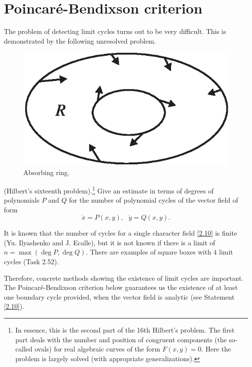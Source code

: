 \section{Poincaré-Bendixson criterion}

The problem of detecting limit cycles turns out to be very difficult. This is demonstrated by the following unresolved problem.

\begin{figure}[!ht]
	\centering
	\includegraphics [scale=1.2]{jtr26}
	\caption{Absorbing ring.}
	\label{fig:2.6}
\end{figure}

\begin{hypothesis}(Hilbert's sixteenth problem).\footnote{In essence, this is the second part of the 16th Hilbert's problem. The first part deals with the number and position of congruent components (the so-called ovals) for real algebraic curves of the form $ F (x, y) = 0 $. Here the problem is largely solved (with appropriate generalizations).}
	Give an estimate in terms of degrees of polynomials $ P $ and $ Q $ for the number of polynomial cycles of the vector field of form
	\begin{equation}
	\label{2.10}
	\dot{x}=P(x,y),\text{ \ \ }\dot{y}=Q(x,y).
	\end{equation}
\end{hypothesis}

\begin{remark}
	It is known that the number of cycles for a single character field \eqref{2.10} is finite (Yu. Ilyashenko and J. Ecalle), but it is not known if there is a limit of $ n = \max (\deg P, \deg Q) $. There are examples of square boxes with 4 limit cycles (Task 2.52).
\end{remark}

Therefore, concrete methods showing the existence of limit cycles are important. The Poincaré-Bendixson criterion below guarantees us the existence of at least one boundary cycle provided, when the vector field is analytic (see Statement \eqref{2.10}).

